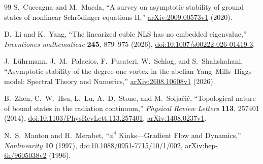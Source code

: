 \begin{thebibliography}{99}
S.~Cuccagna and M.~Maeda,
``A survey on asymptotic stability of ground states of nonlinear
Schr\"odinger equations II,''
\href{https://arxiv.org/abs/2009.00573v1}{arXiv:2009.00573v1} (2020).

D.~Li and K.~Yang,
``The linearized cubic NLS has no embedded eigenvalue,''
\emph{Inventiones mathematicae} \textbf{245}, 879--975 (2026),
\href{https://doi.org/10.1007/s00222-026-01419-3}{doi:10.1007/s00222-026-01419-3}.

J.~L\"uhrmann, J.~M.~Palacios, F.~Pusateri, W.~Schlag, and S.~Shahshahani,
``Asymptotic stability of the degree-one vortex in the abelian
Yang--Mills--Higgs model: Spectral Theory and Numerics,''
\href{https://arxiv.org/abs/2608.10608v1}{arXiv:2608.10608v1} (2026).

B.~Zhen, C.~W.~Hsu, L.~Lu, A.~D.~Stone, and M.~Solja\v{c}i\'c,
``Topological nature of bound states in the radiation continuum,''
\emph{Physical Review Letters} \textbf{113}, 257401 (2014),
\href{https://doi.org/10.1103/PhysRevLett.113.257401}{doi:10.1103/PhysRevLett.113.257401},
\href{https://arxiv.org/abs/1408.0237v1}{arXiv:1408.0237v1}.

N.~S.~Manton and H.~Merabet,
``$\phi^4$ Kinks---Gradient Flow and Dynamics,''
\emph{Nonlinearity} \textbf{10} (1997),
\href{https://doi.org/10.1088/0951-7715/10/1/002}{doi:10.1088/0951-7715/10/1/002},
\href{https://arxiv.org/abs/hep-th/9605038v2}{arXiv:hep-th/9605038v2} (1996).

\end{thebibliography}
